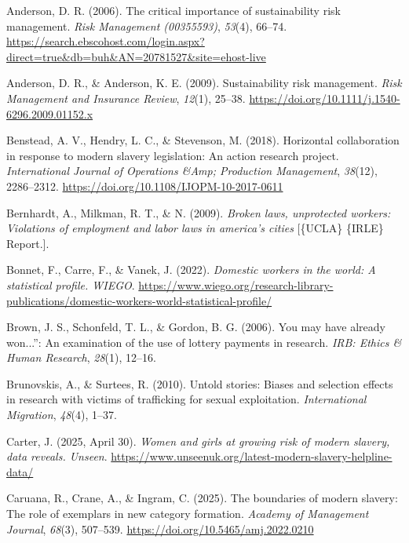 \documentclass[
  12pt,
]{article}
\newlength{\cslhangindent}
\newenvironment{CSLReferences}[2] %
 {\begin{list}{}{%
  \setlength{\itemindent}{0pt}
  \setlength{\leftmargin}{0pt}
  \setlength{\parsep}{0pt}
  \ifodd #1
   \setlength{\leftmargin}{\cslhangindent}
   \setlength{\itemindent}{-1\cslhangindent}
  \fi
  \setlength{\itemsep}{#2\baselineskip}}}
 {\end{list}}
\theoremstyle{plain}
\theoremstyle{definition}
\begin{document}
\label{refs}
\begin{CSLReferences}{1}{0}
Anderson, D. R. (2006). The critical importance of sustainability risk
management. \emph{Risk Management (00355593)}, \emph{53}(4), 66--74.
\url{https://search.ebscohost.com/login.aspx?direct=true&db=buh&AN=20781527&site=ehost-live}

Anderson, D. R., \& Anderson, K. E. (2009). Sustainability risk
management. \emph{Risk Management and Insurance Review}, \emph{12}(1),
25--38. \url{https://doi.org/10.1111/j.1540-6296.2009.01152.x}

Benstead, A. V., Hendry, L. C., \& Stevenson, M. (2018). Horizontal
collaboration in response to modern slavery legislation: An action
research project. \emph{International Journal of Operations \&Amp;
Production Management}, \emph{38}(12), 2286--2312.
\url{https://doi.org/10.1108/IJOPM-10-2017-0611}

Bernhardt, A., Milkman, R. T., \& N. (2009). \emph{Broken laws,
unprotected workers: Violations of employment and labor laws in
america's cities} {[}\{UCLA\} \{IRLE\} Report.{]}.

Bonnet, F., Carre, F., \& Vanek, J. (2022). \emph{Domestic workers in
the world: A statistical profile. {WIEGO}}.
\url{https://www.wiego.org/research-library-publications/domestic-workers-world-statistical-profile/}

Brown, J. S., Schonfeld, T. L., \& Gordon, B. G. (2006). You may have
already won...'': An examination of the use of lottery payments in
research. \emph{{IRB}: Ethics \& Human Research}, \emph{28}(1), 12--16.

Brunovskis, A., \& Surtees, R. (2010). Untold stories: Biases and
selection effects in research with victims of trafficking for sexual
exploitation. \emph{International Migration}, \emph{48}(4), 1--37.

Carter, J. (2025, April 30). \emph{Women and girls at growing risk of
modern slavery, data reveals. Unseen}.
\url{https://www.unseenuk.org/latest-modern-slavery-helpline-data/}

Caruana, R., Crane, A., \& Ingram, C. (2025). The boundaries of modern
slavery: The role of exemplars in new category formation. \emph{Academy
of Management Journal}, \emph{68}(3), 507--539.
\url{https://doi.org/10.5465/amj.2022.0210}


\end{CSLReferences}
\end{document}
